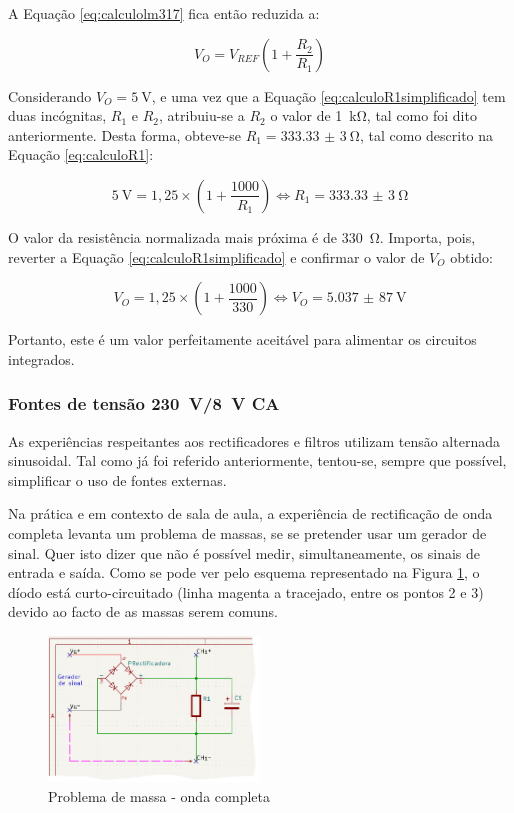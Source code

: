 A Equação \ref{eq:calculolm317} fica então reduzida a:

\begin{equation} \label{eq:calculoR1simplificado}
	V_{O} = V_{REF} (1 + \frac{R_{2}}{R_{1}})
\end{equation}

Considerando $V_{O} = \SI{5}{\volt}$, e uma vez que a Equação \ref{eq:calculoR1simplificado} tem duas incógnitas, $R_{1}$ e $R_{2}$, atribuiu-se a $R_{2}$ o valor de \SI{1}{\kilo\ohm}, tal como foi dito anteriormente. Desta forma, obteve-se $R_{1} = \SI{333,33(3)}{\ohm}$, tal como descrito na Equação \ref{eq:calculoR1}: 

\begin{equation} \label{eq:calculoR1}
	\SI{5}{\volt} = 1,25 \times (1 + \frac{1000}{R_{1}}) \Leftrightarrow R_{1} = \SI{333,33(3)}{\ohm}
\end{equation}

O valor da resistência normalizada mais próxima é de \SI{330}{\ohm}. Importa, pois, reverter a Equação \ref{eq:calculoR1simplificado} e confirmar o valor de  $V_{O}$ obtido:

\begin{equation} \label{eq:confirmacaoVout}
	V_{O} = 1,25 \times (1 + \frac{1000}{330}) \Leftrightarrow V_{O} = \SI{5,037(87)}{\volt}
\end{equation}

Portanto, este é um valor perfeitamente aceitável para alimentar os circuitos integrados.

\subsubsection{Fontes de tensão \SI{230}{\volt}/\SI{8}{\volt} CA}
\label{sec:fontealternada}
As experiências respeitantes aos rectificadores e filtros utilizam tensão alternada sinusoidal. Tal como já foi referido anteriormente, tentou-se, sempre que possível, simplificar o uso de fontes externas. 

Na prática e em contexto de sala de aula, a experiência de rectificação de onda completa levanta um problema de massas, se se pretender usar um gerador de sinal. Quer isto dizer que não é possível medir, simultaneamente, os sinais de entrada e saída. Como se pode ver pelo esquema representado na Figura \ref{fig:gerador-massa}, o díodo está curto-circuitado (linha magenta a tracejado, entre os pontos 2 e 3) devido ao facto de as massas serem comuns. 

\begin{figure}[hbtp]
	\centering
	\includegraphics[width=0.5\textwidth]{figures/sch_completa_CC.png}
	\caption{Problema de massa - onda completa}
	\label{fig:gerador-massa}
\end{figure}


